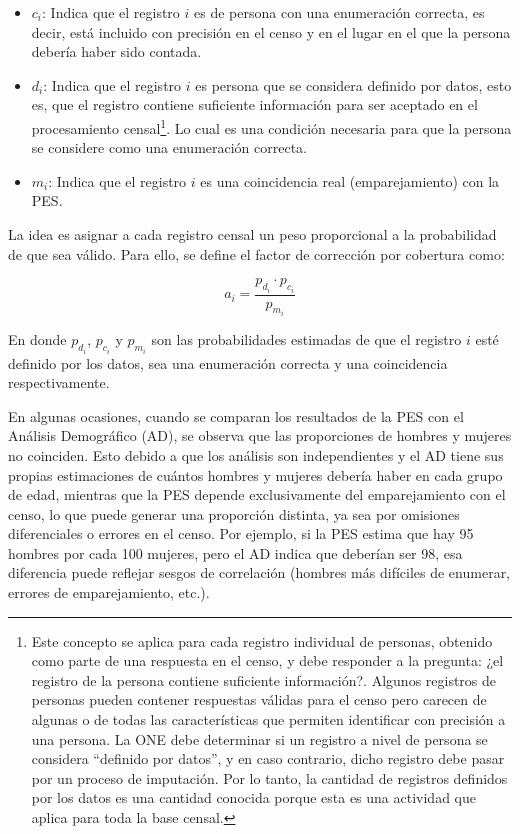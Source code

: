 \documentclass[
  12pt,
]{book}
\begin{document}
\begin{itemize}
\item
  \(c_i\): Indica que el registro \(i\) es de persona con una enumeración correcta, es decir, está incluido con precisión en el censo y en el lugar en el que la persona debería haber sido contada.
\item
  \(d_i\): Indica que el registro \(i\) es persona que se considera definido por datos, esto es, que el registro contiene suficiente información para ser aceptado en el procesamiento censal\footnote{Este concepto se aplica para cada registro individual de personas, obtenido como parte de una respuesta en el censo, y debe responder a la pregunta: ¿el registro de la persona contiene suficiente información?. Algunos registros de personas pueden contener respuestas válidas para el censo pero carecen de algunas o de todas las características que permiten identificar con precisión a una persona. La ONE debe determinar si un registro a nivel de persona se considera ``definido por datos'', y en caso contrario, dicho registro debe pasar por un proceso de imputación. Por lo tanto, la cantidad de registros definidos por los datos es una cantidad conocida porque esta es una actividad que aplica para toda la base censal.}. Lo cual es una condición necesaria para que la persona se considere como una enumeración correcta.
\item
  \(m_i\): Indica que el registro \(i\) es una coincidencia real (emparejamiento) con la PES.
\end{itemize}

La idea es asignar a cada registro censal un peso proporcional a la probabilidad de que sea válido. Para ello, se define el factor de corrección por cobertura como:

\[a_i = \frac{p_{d_i}\cdot p_{c_i}}{p_{m_i}} \]

En donde \(p_{d_i}\), \(p_{c_i}\) y \(p_{m_i}\) son las probabilidades estimadas de que el registro \(i\) esté definido por los datos, sea una enumeración correcta y una coincidencia respectivamente.

En algunas ocasiones, cuando se comparan los resultados de la PES con el Análisis Demográfico (AD), se observa que las proporciones de hombres y mujeres no coinciden. Esto debido a que los análisis son independientes y el AD tiene sus propias estimaciones de cuántos hombres y mujeres debería haber en cada grupo de edad, mientras que la PES depende exclusivamente del emparejamiento con el censo, lo que puede generar una proporción distinta, ya sea por omisiones diferenciales o errores en el censo. Por ejemplo, si la PES estima que hay 95 hombres por cada 100 mujeres, pero el AD indica que deberían ser 98, esa diferencia puede reflejar sesgos de correlación (hombres más difíciles de enumerar, errores de emparejamiento, etc.).
\end{document}

